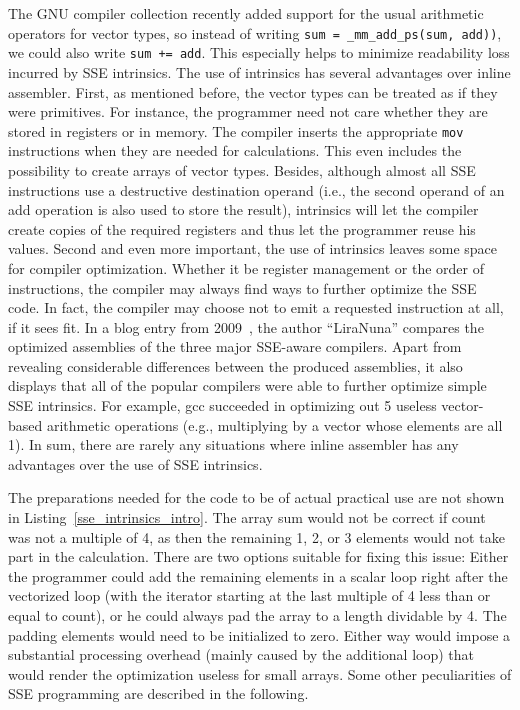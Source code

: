 The GNU compiler collection recently added support for the usual arithmetic operators for vector types, so instead of writing \texttt{sum = \_mm\_add\_ps(sum, add))}, we could also write \texttt{sum += add}. This especially helps to minimize readability loss incurred by SSE intrinsics. The use of intrinsics has several advantages over inline assembler. First, as mentioned before, the vector types can be treated as if they were primitives. For instance, the programmer need not care whether they are stored in registers or in memory. The compiler inserts the appropriate \texttt{mov} instructions when they are needed for calculations. This even includes the possibility to create arrays of vector types. Besides, although almost all SSE instructions use a destructive destination operand (i.e., the second operand of an add operation is also used to store the result), intrinsics will let the compiler create copies of the required registers and thus let the programmer reuse his values. Second and even more important, the use of intrinsics leaves some space for compiler optimization. Whether it be register management or the order of instructions, the compiler may always find ways to further optimize the SSE code. In fact, the compiler may choose not to emit a requested instruction at all, if it sees fit. In a blog entry from 2009~\cite{liranuna2009}, the author ``LiraNuna'' compares the optimized assemblies of the three major SSE-aware compilers. Apart from revealing considerable differences between the produced assemblies, it also displays that all of the popular compilers were able to further optimize simple SSE intrinsics. For example, gcc succeeded in optimizing out 5 useless vector-based arithmetic operations (e.g., multiplying by a vector whose elements are all 1). In sum, there are rarely any situations where inline assembler has any advantages over the use of SSE intrinsics.

The preparations needed for the code to be of actual practical use are not shown in Listing~\ref{sse_intrinsics_intro}. The array sum would not be correct if count was not a multiple of 4, as then the remaining 1, 2, or 3 elements would not take part in the calculation. There are two options suitable for fixing this issue: Either the programmer could add the remaining elements in a scalar loop right after the vectorized loop (with the iterator starting at the last multiple of 4 less than or equal to count), or he could always pad the array to a length dividable by 4. The padding elements would need to be initialized to zero. Either way would impose a substantial processing overhead (mainly caused by the additional loop) that would render the optimization useless for small arrays. Some other peculiarities of SSE programming are described in the following.

